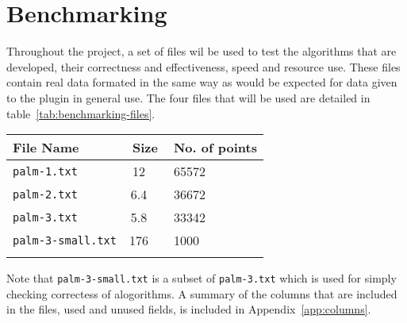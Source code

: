 
\section{Benchmarking}
\label{sec:benchmarking}

Throughout the project, a set of files wil be used to test the algorithms that
are developed, their correctness and effectiveness, speed and resource use.
These files contain real data formated in the same way as would be expected for
data given to the plugin in general use. The four files that will be used are
detailed in table~\ref{tab:benchmarking-files}.

\renewcommand{\arraystretch}{1.3}
\begin{center}
\begin{tabu} {l c l}
	\toprule
	File Name & Size & No. of points \\
	\midrule
	\texttt{palm-1.txt} & \SI{12}{\mebi\byte} & 65572 \\
	\texttt{palm-2.txt} & \SI{6.4}{\mebi\byte} & 36672 \\
	\texttt{palm-3.txt} & \SI{5.8}{\mebi\byte} & 33342 \\
	\texttt{palm-3-small.txt} & \SI{176}{\kibi\byte} & 1000 \\
	\bottomrule
	\label{tab:benchmarking-files}
\end{tabu}
\end{center}

Note that \texttt{palm-3-small.txt} is a subset of \texttt{palm-3.txt} which is
used for simply checking correctess of alogorithms. A summary of the columns
that are included in the files, used and unused fields, is included in
Appendix~\ref{app:columns}.
